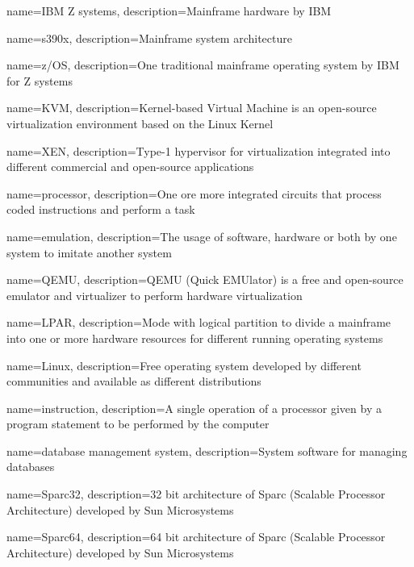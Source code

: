 {
    name={IBM Z systems},
    description={Mainframe hardware by IBM}
}

{
    name={s390x},
    description={Mainframe system architecture}
}

{
    name={z/OS},
    description={One traditional mainframe operating system by IBM for Z systems}
}

{
    name={KVM},
    description={Kernel-based Virtual Machine is an open-source virtualization environment based on the Linux Kernel}
}

{
    name={XEN},
    description={Type-1 hypervisor for virtualization integrated into different commercial and open-source applications}
}

{
    name={processor},
    description={One ore more integrated circuits that process coded instructions and perform a task}
}

{
    name={emulation},
    description={The usage of software, hardware or both by one system to imitate another system}
}

{
    name={QEMU},
    description={QEMU (Quick EMUlator) is a free and open-source emulator and virtualizer to perform hardware virtualization}
}

{
    name={LPAR},
    description={Mode with logical partition to divide a mainframe into one or more hardware resources for different running operating systems}
}

{
    name={Linux},
    description={Free operating system developed by different communities and available as different distributions}
}

{
    name={instruction},
    description={A single operation of a processor given by a program statement to be performed by the computer}
}

{
    name={database management system},
    description={System software for managing databases}
}

{
    name={Sparc32},
    description={32 bit architecture of Sparc (Scalable Processor Architecture) developed by Sun Microsystems}
}

{
    name={Sparc64},
    description={64 bit architecture of Sparc (Scalable Processor Architecture) developed by Sun Microsystems}
}

